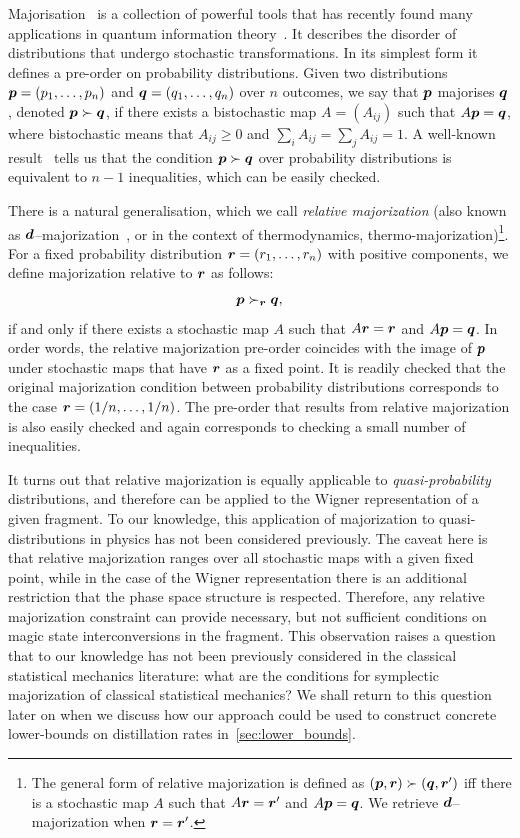 \documentclass[pra,
aps,
twocolumn,
superscriptaddress,
groupedaddress,
nofootinbib,
reprint
]{revtex4-1}
\begin{document}
Majorisation~\cite{cit:marshall} is a collection of powerful tools that has recently found many applications in quantum information theory~\cite{Nielsen_1999, cit:cwiklinski, cit:lostaglio2, cit:gour, cit:gour2, Horodecki_2003, Vallejos_2021}.
It describes the disorder of distributions that undergo stochastic transformations. In its simplest form it defines a pre-order on probability distributions. Given two distributions $\boldsymbol{p}= (p_1, \dots, p_n)$ and $\boldsymbol{q} = (q_1, \dots, q_n)$ over $n$ outcomes, we say that $\boldsymbol{p}$ majorises $\boldsymbol{q}$, denoted $\boldsymbol{p} \succ \boldsymbol{q}$, if there exists a bistochastic map $A = (A_{ij})$ such that $A\boldsymbol{p} = \boldsymbol{q}$, where bistochastic means that $A_{ij} \geq 0$ and $\sum_i A_{ij} = \sum_j A_{ij} = 1$. A well-known result~\cite{cit:marshall} tells us that the condition $ \boldsymbol{p} \succ \boldsymbol{q}$ over probability distributions is equivalent to $n-1$ inequalities, which can be easily checked.

There is a natural generalisation, which we call \emph{relative majorization} (also known as $\bm{d}$--majorization~\cite{Veinott_1971}, or in the context of thermodynamics, thermo-majorization)\footnote{The general form of relative majorization is defined as $(\boldsymbol{p},\boldsymbol{r}) \succ (\boldsymbol{q}, \boldsymbol{r}')$ iff there is a stochastic map $A$ such that $A\boldsymbol{r} = \boldsymbol{r}'$ and $A\boldsymbol{p} = \boldsymbol{q}$. We retrieve $\bm{d}$--majorization when $\boldsymbol{r} = \boldsymbol{r}'$.}. For a fixed probability distribution $\boldsymbol{r} = (r_1, \dots, r_n)$ with positive components, we define majorization relative to $\boldsymbol{r}$ as follows:
\begin{equation}
\boldsymbol{p} \succ_{\boldsymbol{r}} \boldsymbol{q},
\end{equation}
if and only if there exists a stochastic map $A$ such that $A\boldsymbol{r} = \boldsymbol{r}$ and $A \boldsymbol{p} = \boldsymbol{q}$. In order words, the relative majorization pre-order coincides with the image of $\boldsymbol{p}$ under stochastic maps that have $\boldsymbol{r}$ as a fixed point. It is readily checked that the original majorization condition between probability distributions corresponds to the case $\boldsymbol{r} = (1/n, \dots, 1/n)$. The pre-order that results from relative majorization is also easily checked and again corresponds to checking a small number of inequalities.

It turns out that relative majorization is equally applicable to \emph{quasi-probability} distributions, and therefore can be applied to the Wigner representation of a given fragment. To our knowledge, this application of majorization to quasi-distributions in  physics has not been considered previously. The caveat here is that relative majorization ranges over all stochastic maps with a given fixed point, while in the case of the Wigner representation there is an additional restriction that the phase space structure is respected. Therefore, any relative majorization constraint can provide necessary, but not sufficient conditions on magic state interconversions in the fragment. This observation raises a question that to our knowledge has not been previously considered in the classical statistical mechanics literature: what are the conditions for symplectic majorization of classical statistical mechanics? We shall return to this question later on when we discuss how our approach could be used to construct concrete lower-bounds on distillation rates in~\cref{sec:lower_bounds}.
\end{document}
